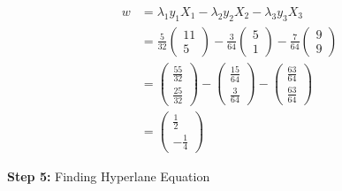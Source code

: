 \documentclass[12pt]{report}
\begin{document}
\begin{equation}
	\begin{aligned}
		w & = \lambda_{1}y_{1}X_{1} - \lambda_{2}y_{2}X_{2} - \lambda_{3}y_{3}X_{3}                                                                                                                                                  \\
		  & = \frac{5}{32}\begin{pmatrix}11                                         \\ 5\end{pmatrix}-\frac{3}{64}\begin{pmatrix}5\\ 1\end{pmatrix}-\frac{7}{64}\begin{pmatrix}9\\ 9\end{pmatrix}                                    \\
		  & = \begin{pmatrix}\frac{55}{32}                                          \\ \frac{25}{32}\end{pmatrix}-\begin{pmatrix}\frac{15}{64}\\ \frac{3}{64}\end{pmatrix}-\begin{pmatrix}\frac{63}{64}\\ \frac{63}{64}\end{pmatrix} \\
		  & = \begin{pmatrix}\frac{1}{2}                                            \\ -\frac{1}{4}\end{pmatrix}
	\end{aligned}
\end{equation}

\vspace{20pt}

\textbf{Step 5:} Finding Hyperlane Equation
\end{document}
